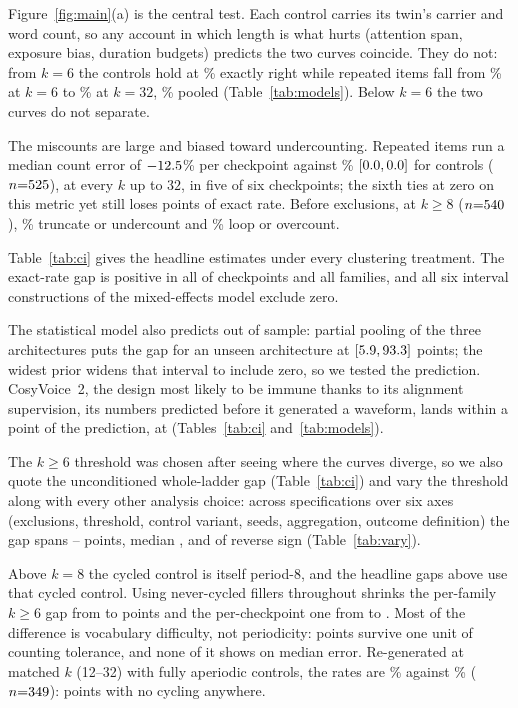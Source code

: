 \documentclass{article}
\begin{document}
Figure~\ref{fig:main}(a) is the central test. Each control
carries its twin's carrier and word count, so any account in which
length is what hurts (attention span, exposure bias, duration budgets)
predicts the two curves coincide.
They do not: from $k{=}6$ the controls hold at \ExactCtl{}\% exactly
right while repeated items fall from \ExactRepKLo{}\% at $k{=}6$ to
\ExactRepKHi{}\% at $k{=}32$, \ExactRep{}\% pooled
(Table~\ref{tab:models}). Below $k{=}6$ the two curves do not separate.

The miscounts are large and biased toward undercounting. Repeated items
run a median count error of $-12.5{}$\% per checkpoint against
\ErrCtl{}\% $[0.0{},0.0{}]$ for controls
($n{=}525{}$), at every $k$ up to $32$, in five of six checkpoints;
the sixth ties at zero on this metric yet still loses \CkRevExact{}
points of exact rate. Before exclusions, at $k{\ge}8$ ($n{=}540{}$),
\TruncPct{}\% truncate or undercount and \LoopPct{}\% loop or overcount.

Table~\ref{tab:ci} gives the headline estimates under every clustering
treatment. The exact-rate gap is positive in all \CkExactNPos{} of \CkExactN{}
checkpoints and all \FamExactN{} families, and all six interval
constructions of the mixed-effects model exclude zero.

The statistical model also predicts out of sample: partial pooling of
the three architectures puts the gap for an unseen architecture at
\BayesNewFam{} $[5.9{},93.3{}]$ points; the widest
prior widens that interval to include zero, so we tested the prediction. CosyVoice~2, the design most likely to be immune thanks to
its alignment supervision, its numbers predicted before it generated a
waveform, lands within a point of the prediction, at \CosyGap{}
(Tables~\ref{tab:ci} and~\ref{tab:models}).

The $k{\ge}6$ threshold was chosen after seeing where the curves diverge, so
we also quote the unconditioned whole-ladder gap (Table~\ref{tab:ci}) and
vary the threshold along with every other analysis choice: across \SpecN{}
specifications over six axes (exclusions, threshold, control variant,
seeds, aggregation, outcome definition) the gap spans
\SpecLo{}--\SpecHi{} points, median \SpecMed{}, and \SpecNRev{} of \SpecN{}
reverse sign (Table~\ref{tab:vary}).

Above $k{=}8$ the cycled control is itself period-8, and the headline
gaps above use that cycled control. Using never-cycled fillers throughout
shrinks the per-family $k{\ge}6$ gap from \ApHeadFamCyc{} to
\ApHeadFam{} points and the per-checkpoint one from \ApHeadCkCyc{} to
\ApHeadCk{}. Most of the difference is
vocabulary difficulty, not periodicity: \ApHeadTolDrop{} points survive one
unit of counting tolerance, and none of it shows on median error.
Re-generated at matched $k$ (12--32) with fully
aperiodic controls, the rates are \ApMidRep{}\% against \ApMidCtl{}\%
($n{=}349{}$): \ApMidGap{} points with no cycling anywhere.
\end{document}
